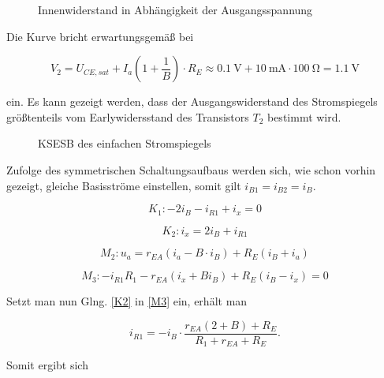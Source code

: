 \begin{figure}[H]
	\centering \small
	\scalebox{0.9}{}
	\caption{Innenwiderstand in Abhängigkeit der Ausgangsspannung}
	\label{fig_Kap4_05:Ri}
\end{figure}

Die Kurve bricht erwartungsgemäß bei 

\begin{equation}
    V_2 = U_{CE,sat} + I_a (1 + \frac{1}{B}) \cdot R_E \approx \SI{0,1}{\volt} + \SI{10}{\milli\ampere} \cdot \SI{100}{\ohm} = \SI{1,1}{\volt}
\end{equation}

ein. Es kann gezeigt werden, dass der Ausgangswiderstand des Stromspiegels größtenteils vom Earlywidersstand des Transistors $T_2$ bestimmt wird. 

\begin{figure}[H]
	\centering
	\def\svgwidth{0.9\textwidth}
	
	\caption{KSESB des einfachen Stromspiegels} 
	\label{fig_Kap4_11:Stromspiegel01} 
\end{figure}

Zufolge des symmetrischen Schaltungsaufbaus werden sich, wie schon vorhin gezeigt, gleiche Basisströme einstellen, somit gilt $i_{B1} = i_{B2} = i_{B}$.

\begin{equation}
    \label{K1}
    K_1: -2i_B - i_{R1} + i_x = 0
\end{equation}

\begin{equation}
    \label{K2}
    K_2: i_x = 2i_B + i_{R1}
\end{equation}

\begin{equation}
    \label{M2}
    M_2: u_a = r_{EA} (i_a - B\cdot i_B) + R_E (i_B + i_a)
\end{equation}

\begin{equation}
    \label{M3}
    M_3: -i_{R1} R_1 - r_{EA}(i_x + Bi_B) + R_E (i_B - i_x) = 0
\end{equation}

Setzt man nun Glng. \ref{K2} in \ref{M3} ein, erhält man

\begin{equation}
    i_{R1} = -i_B \cdot \frac{r_{EA}(2+B) + R_E}{R_1 + r_{EA} + R_E}.
\end{equation}

Somit ergibt sich

